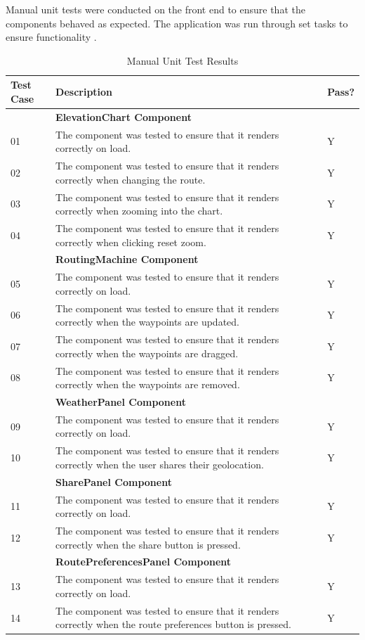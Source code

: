 Manual unit tests were conducted on the front end to ensure that the components behaved as expected. The application was run through set tasks to ensure functionality .

\begin{table}
\caption{Manual Unit Test Results}
\label{tab:unit-test-results}
\renewcommand{\arraystretch}{1.5} %
\begin{tabular}{ p{1.85cm} p{10cm}  p{1.85cm} }
\hline
Test Case & Description & Pass?\\
\hline
 & \multicolumn{2}{p{11.85cm}}{\textbf{ElevationChart Component}}\\
01 & The component was tested to ensure that it renders correctly on load. & Y\\
02 & The component was tested to ensure that it renders correctly when changing the route. & Y\\
03 & The component was tested to ensure that it renders correctly when zooming into the chart. & Y\\
04 & The component was tested to ensure that it renders correctly when clicking reset zoom. & Y\\
\hline
 & \multicolumn{2}{p{11.85cm}}{\textbf{RoutingMachine Component}}\\
05 & The component was tested to ensure that it renders correctly on load. & Y\\
06 & The component was tested to ensure that it renders correctly when the waypoints are updated. & Y\\
07 & The component was tested to ensure that it renders correctly when the waypoints are dragged. & Y\\
08 & The component was tested to ensure that it renders correctly when the waypoints are removed. & Y\\
\hline
 & \multicolumn{2}{p{11.85cm}}{\textbf{WeatherPanel Component}}\\
09 & The component was tested to ensure that it renders correctly on load. & Y\\
10 & The component was tested to ensure that it renders correctly when the user shares their geolocation. & Y\\
\hline
 & \multicolumn{2}{p{11.85cm}}{\textbf{SharePanel Component}}\\
11 & The component was tested to ensure that it renders correctly on load. & Y\\
12 & The component was tested to ensure that it renders correctly when the share button is pressed. & Y\\
\hline
 & \multicolumn{2}{p{11.85cm}}{\textbf{RoutePreferencesPanel Component}}\\
13 & The component was tested to ensure that it renders correctly on load. & Y\\
14 & The component was tested to ensure that it renders correctly when the route preferences button is pressed. & Y\\
\end{tabular}
\end{table}

